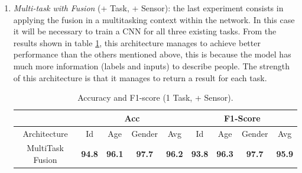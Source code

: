 \begin{enumerate}
    \item \emph{Multi-task with Fusion} (+ Task, + Sensor): the last experiment consists in applying the fusion in a multitasking context within the network. In this case it will be necessary to train a CNN for all three existing tasks. From the results shown in table \ref{table accuracy and F1 (+ Task, + Sensor)}, this architecture manages to achieve better performance than the others mentioned above, this is because the model has much more information (labels and inputs) to describe people. The strength of this architecture is that it manages to return a result for each task.
    \begin{table}[h!]
        \centering
        \begin{adjustbox}{max width=\textwidth}
        \begin{tabular}{|c||ccc|c||ccc|c|}
            \hline
                & \multicolumn{4}{c||}{Acc} & \multicolumn{4}{c|}{F1-Score} \\
            \hline
                Architecture & Id & Age & Gender & Avg & Id & Age & Gender & Avg\\
            \hline
                MultiTask Fusion & \bfseries{94.8} & \bfseries{96.1} & \bfseries{97.7} & \bfseries{96.2} & \bfseries{93.8} & \bfseries{96.3} & \bfseries{97.7} & \bfseries{95.9}\\
            \hline 
        \end{tabular}
        \end{adjustbox}
        \caption{Accuracy and F1-score (1 Task, + Sensor).}
        \label{table accuracy and F1 (+ Task, + Sensor)}
    \end{table}

\end{enumerate}